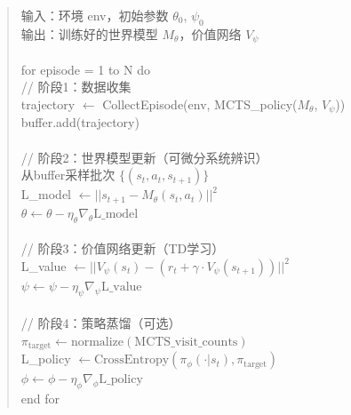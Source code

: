 \documentclass[UTF8]{ctexart}
\begin{document}
\begin{quote}
\ttfamily
输入：环境 env，初始参数 $\theta_0$, $\psi_0$ \\
输出：训练好的世界模型 $M_\theta$，价值网络 $V_\psi$ \\
~\\
for episode = 1 to N do \\
\hspace*{4em}// 阶段1：数据收集 \\
\hspace*{4em}trajectory $\leftarrow$ CollectEpisode(env, MCTS\_policy($M_\theta$, $V_\psi$)) \\
\hspace*{4em}buffer.add(trajectory) \\
~\\
\hspace*{4em}// 阶段2：世界模型更新（可微分系统辨识） \\
\hspace*{4em}从buffer采样批次 $\{(s_t, a_t, s_{t+1})\}$ \\
\hspace*{4em}L\_model $\leftarrow ||s_{t+1} - M_\theta(s_t, a_t)||^2$ \\
\hspace*{4em}$\theta \leftarrow \theta - \eta_\theta \nabla_\theta \text{L\_model}$ \\
~\\
\hspace*{4em}// 阶段3：价值网络更新（TD学习） \\
\hspace*{4em}L\_value $\leftarrow ||V_\psi(s_t) - (r_t + \gamma \cdot V_\psi(s_{t+1}))||^2$ \\
\hspace*{4em}$\psi \leftarrow \psi - \eta_\psi \nabla_\psi \text{L\_value}$ \\
~\\
\hspace*{4em}// 阶段4：策略蒸馏（可选） \\
\hspace*{4em}$\pi_{\text{target}} \leftarrow \text{normalize}(\text{MCTS\_visit\_counts})$ \\
\hspace*{4em}L\_policy $\leftarrow \text{CrossEntropy}(\pi_\phi(\cdot|s_t), \pi_{\text{target}})$ \\
\hspace*{4em}$\phi \leftarrow \phi - \eta_\phi \nabla_\phi \text{L\_policy}$ \\
end for
\end{quote}
\end{document}
